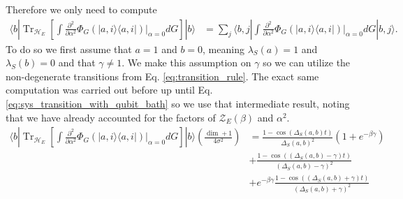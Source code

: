 \documentclass{article}
\newcommand{\ket}[1]{|#1\rangle}
\newcommand{\bra}[1]{\langle #1|}
\newcommand{\ketbra}[2]{| #1\rangle\! \langle #2|}
\newcommand{\parens}[1]{\left( #1 \right)}
\newcommand{\brackets}[1]{\left[ #1 \right]}
\DeclareMathOperator{\Tr}{Tr}
\newcommand{\partrace}[2]{\Tr_{#1} \brackets{ #2 }}
\newcommand{\hilb}{\mathcal{H}}
\newcommand{\partfun}{\mathcal{Z}}
\begin{document}
Therefore we only need to compute 
\begin{align}
\bra{b} \partrace{\hilb_E}{\int \frac{\partial^2}{\partial \alpha^2} \Phi_G(\ketbra{a,i}{a,i})\bigg|_{\alpha=0} dG} \ket{b} &= \sum_{j} \bra{b,j} \int \frac{\partial^2}{\partial \alpha^2} \Phi_G(\ketbra{a,i}{a,i})\bigg|_{\alpha=0} dG \ket{b,j}.
\end{align}
To do so we first assume that $a = 1$ and $b = 0$, meaning $\lambda_S(a) = 1$ and $\lambda_S(b) = 0$ and that $\gamma \neq 1$. We make this assumption on $\gamma$ so we can utilize the non-degenerate transitions from Eq. \eqref{eq:transition_rule}. The exact same computation was carried out before up until Eq. \eqref{eq:sys_transition_with_qubit_bath} so we use that intermediate result, noting that we have already accounted for the factors of $\partfun_E(\beta)$ and $\alpha^2$. 
\begin{align}
    \bra{b} \partrace{\hilb_E}{\int \frac{\partial^2}{\partial \alpha^2} \Phi_G(\ketbra{a,i}{a,i})\bigg|_{\alpha=0} dG} \ket{b} \parens{\frac{\dim + 1}{4 \sigma^2}} &= \frac{1 - \cos(\Delta_S(a,b)t)}{\Delta_S(a,b)^2}(1 + e^{-\beta \gamma}) \nonumber \\
    &+ \frac{1 - \cos((\Delta_S(a,b) - \gamma)t)}{(\Delta_S(a,b) - \gamma)^2} \nonumber \\
    &+ e^{-\beta \gamma} \frac{1 - \cos((\Delta_S(a,b) + \gamma)t)}{(\Delta_S(a,b) + \gamma)^2}
\end{align}
\end{document}
